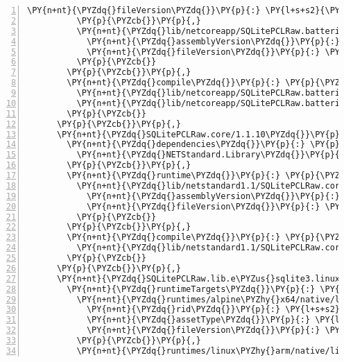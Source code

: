 \begin{Verbatim}[commandchars=\\\{\},numbers=left,firstnumber=1,stepnumber=1,numberblanklines=0]
            \PY{n+nt}{\PYZdq{}fileVersion\PYZdq{}}\PY{p}{:} \PY{l+s+s2}{\PYZdq{}1.0.0.0\PYZdq{}}
          \PY{p}{\PYZcb{}}\PY{p}{,}
          \PY{n+nt}{\PYZdq{}lib/netcoreapp/SQLitePCLRaw.batteries\PYZus{}v2.dll\PYZdq{}}\PY{p}{:} \PY{p}{\PYZob{}}
            \PY{n+nt}{\PYZdq{}assemblyVersion\PYZdq{}}\PY{p}{:} \PY{l+s+s2}{\PYZdq{}1.1.10.86\PYZdq{}}\PY{p}{,}
            \PY{n+nt}{\PYZdq{}fileVersion\PYZdq{}}\PY{p}{:} \PY{l+s+s2}{\PYZdq{}1.0.0.0\PYZdq{}}
          \PY{p}{\PYZcb{}}
        \PY{p}{\PYZcb{}}\PY{p}{,}
        \PY{n+nt}{\PYZdq{}compile\PYZdq{}}\PY{p}{:} \PY{p}{\PYZob{}}
          \PY{n+nt}{\PYZdq{}lib/netcoreapp/SQLitePCLRaw.batteries\PYZus{}green.dll\PYZdq{}}\PY{p}{:} \PY{p}{\PYZob{}}\PY{p}{\PYZcb{}}\PY{p}{,}
          \PY{n+nt}{\PYZdq{}lib/netcoreapp/SQLitePCLRaw.batteries\PYZus{}v2.dll\PYZdq{}}\PY{p}{:} \PY{p}{\PYZob{}}\PY{p}{\PYZcb{}}
        \PY{p}{\PYZcb{}}
      \PY{p}{\PYZcb{}}\PY{p}{,}
      \PY{n+nt}{\PYZdq{}SQLitePCLRaw.core/1.1.10\PYZdq{}}\PY{p}{:} \PY{p}{\PYZob{}}
        \PY{n+nt}{\PYZdq{}dependencies\PYZdq{}}\PY{p}{:} \PY{p}{\PYZob{}}
          \PY{n+nt}{\PYZdq{}NETStandard.Library\PYZdq{}}\PY{p}{:} \PY{l+s+s2}{\PYZdq{}2.0.3\PYZdq{}}
        \PY{p}{\PYZcb{}}\PY{p}{,}
        \PY{n+nt}{\PYZdq{}runtime\PYZdq{}}\PY{p}{:} \PY{p}{\PYZob{}}
          \PY{n+nt}{\PYZdq{}lib/netstandard1.1/SQLitePCLRaw.core.dll\PYZdq{}}\PY{p}{:} \PY{p}{\PYZob{}}
            \PY{n+nt}{\PYZdq{}assemblyVersion\PYZdq{}}\PY{p}{:} \PY{l+s+s2}{\PYZdq{}1.1.10.86\PYZdq{}}\PY{p}{,}
            \PY{n+nt}{\PYZdq{}fileVersion\PYZdq{}}\PY{p}{:} \PY{l+s+s2}{\PYZdq{}1.0.0.0\PYZdq{}}
          \PY{p}{\PYZcb{}}
        \PY{p}{\PYZcb{}}\PY{p}{,}
        \PY{n+nt}{\PYZdq{}compile\PYZdq{}}\PY{p}{:} \PY{p}{\PYZob{}}
          \PY{n+nt}{\PYZdq{}lib/netstandard1.1/SQLitePCLRaw.core.dll\PYZdq{}}\PY{p}{:} \PY{p}{\PYZob{}}\PY{p}{\PYZcb{}}
        \PY{p}{\PYZcb{}}
      \PY{p}{\PYZcb{}}\PY{p}{,}
      \PY{n+nt}{\PYZdq{}SQLitePCLRaw.lib.e\PYZus{}sqlite3.linux/1.1.10\PYZdq{}}\PY{p}{:} \PY{p}{\PYZob{}}
        \PY{n+nt}{\PYZdq{}runtimeTargets\PYZdq{}}\PY{p}{:} \PY{p}{\PYZob{}}
          \PY{n+nt}{\PYZdq{}runtimes/alpine\PYZhy{}x64/native/libe\PYZus{}sqlite3.so\PYZdq{}}\PY{p}{:} \PY{p}{\PYZob{}}
            \PY{n+nt}{\PYZdq{}rid\PYZdq{}}\PY{p}{:} \PY{l+s+s2}{\PYZdq{}alpine\PYZhy{}x64\PYZdq{}}\PY{p}{,}
            \PY{n+nt}{\PYZdq{}assetType\PYZdq{}}\PY{p}{:} \PY{l+s+s2}{\PYZdq{}native\PYZdq{}}\PY{p}{,}
            \PY{n+nt}{\PYZdq{}fileVersion\PYZdq{}}\PY{p}{:} \PY{l+s+s2}{\PYZdq{}0.0.0.0\PYZdq{}}
          \PY{p}{\PYZcb{}}\PY{p}{,}
          \PY{n+nt}{\PYZdq{}runtimes/linux\PYZhy{}arm/native/libe\PYZus{}sqlite3.so\PYZdq{}}\PY{p}{:} \PY{p}{\PYZob{}}

\end{Verbatim}
